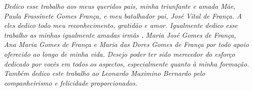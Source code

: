 \begin{dedicatoria}
   \vspace*{\fill}
   \centering
   \noindent
   \textit{ Dedico esse trabalho aos meus queridos pais, minha triunfante e amada Mãe, Paula Frassinete Gomes França, e meu batalhador pai, José Vital de França. A eles dedico todo meu reconhecimento, gratidão e amor. Igualmente dedico esse trabalho as minhas igualmente amadas irmâs , Maria José Gomes de França, Ana Maria Gomes de França e Maria das Dores Gomes de França por todo apoio oferecido ao longo de minha vida. Desejo poder ter sido merecedor do esforço dedicado por vocês em todos os aspectos, especialmente quanto à minha formação. Também dedico este trabalho ao Leonardo Maximino Bernardo pelo companheirismo e felicidade proporcionados.} \vspace*{\fill}
\end{dedicatoria}
